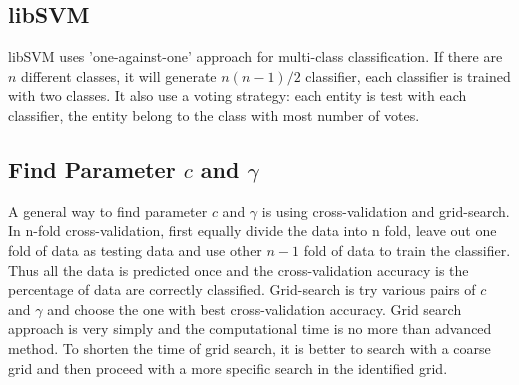 \subsection{libSVM}
libSVM uses 'one-against-one' approach for multi-class classification\cite{CC01a}. If there are $n$ different classes, it will generate $n(n-1)/2$ classifier, each classifier is trained with two classes. It also use a voting strategy: each entity is test with each classifier, the entity belong to the class with most number of votes.
\subsection{Find Parameter $c$ and $\gamma$}
A general way to find parameter $c$ and $\gamma$ is using cross-validation and grid-search. In n-fold cross-validation, first equally divide the data into n fold, leave out one fold of data as testing data and use other $n-1$ fold of data to train the classifier. Thus all the data is predicted once and the cross-validation accuracy is the percentage of data are correctly classified. 
Grid-search is try various pairs of $c$ and $\gamma$ and choose the one with best cross-validation accuracy. Grid search approach is very simply and the computational time is no more than advanced method. To shorten the time of grid search, it is better to search with a coarse grid and then proceed with a more specific search in the identified grid.
